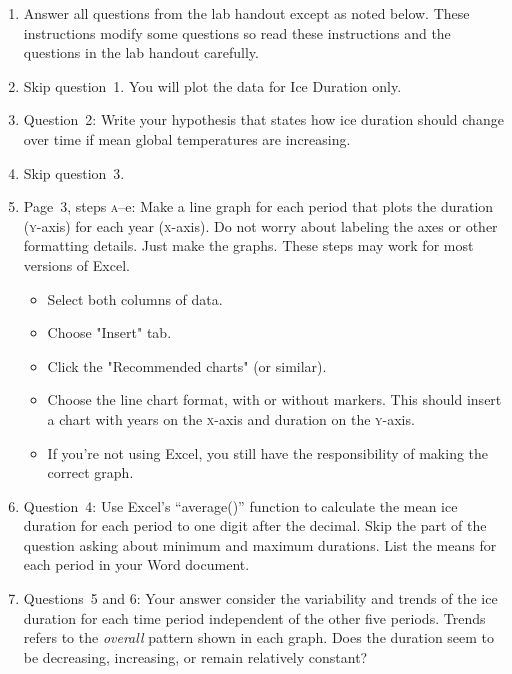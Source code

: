 \documentclass[12pt]{exam}
\begin{document}
\begin{enumerate}


\item Answer all questions from the lab  handout except as noted below. These instructions modify some questions so read these instructions and the
questions in the lab handout carefully.

\item Skip question~1. You will plot the data for Ice Duration only. 

\item Question~2: Write your hypothesis that states how ice duration should change over time if mean global temperatures are increasing.

\item Skip question~3.

\item Page~3, steps \textsc{a}–{e}: Make a line graph for each period that plots the duration (\textsc{y}-axis) for each year (\textsc{x}-axis). Do not worry about labeling the axes or other formatting details. Just make the graphs. These steps may work for most versions of Excel. 

\begin{itemize}
\item Select both columns of data. 
\item Choose "Insert" tab.
\item Click the "Recommended charts" (or similar).
\item Choose the line chart format, with or without markers. This should insert a chart with years on the \textsc{x}-axis and duration on the \textsc{y}-axis.
\item If you're not using Excel, you still have the responsibility of making the correct graph.
\end{itemize}

\item Question~4: Use Excel's “average()” function to calculate the mean ice duration for each period to one digit after the decimal. Skip the part of the question asking about minimum and maximum durations. List the means for each period in your Word document.

\item Questions~5 and 6: Your answer consider the variability and trends of the ice duration for each time period independent of the other five periods. Trends refers to the \emph{overall} pattern shown in each graph. Does the duration seem to be decreasing, increasing, or remain relatively constant?


\end{enumerate}
\end{document}

